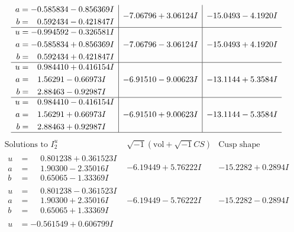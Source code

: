\documentclass[1p]{elsarticle_modified}
\theoremstyle{definition}
\newcommand{\I}{\sqrt{-1}}
\begin{document}
$$\begin{array}{c|c|c}
\begin{aligned}
a &= -0.585834 - 0.856369 I \\
b &= \phantom{-}0.592434 - 0.421847 I\end{aligned}
 & -7.06796 + 3.06124 I & -15.0493 - 4.1920 I \\ \hline\begin{aligned}
u &= -0.994592 - 0.326581 I \\
a &= -0.585834 + 0.856369 I \\
b &= \phantom{-}0.592434 + 0.421847 I\end{aligned}
 & -7.06796 - 3.06124 I & -15.0493 + 4.1920 I \\ \hline\begin{aligned}
u &= \phantom{-}0.984410 + 0.416154 I \\
a &= \phantom{-}1.56291 - 0.66973 I \\
b &= \phantom{-}2.88463 - 0.92987 I\end{aligned}
 & -6.91510 - 9.00623 I & -13.1144 + 5.3584 I \\ \hline\begin{aligned}
u &= \phantom{-}0.984410 - 0.416154 I \\
a &= \phantom{-}1.56291 + 0.66973 I \\
b &= \phantom{-}2.88463 + 0.92987 I\end{aligned}
 & -6.91510 + 9.00623 I & -13.1144 - 5.3584 I\\
 \hline 
 \end{array}$$\newpage$$\begin{array}{c|c|c}  
\text{Solutions to }I^u_{2}& \I (\text{vol} + \sqrt{-1}CS) & \text{Cusp shape}\\
 \hline 
\begin{aligned}
u &= \phantom{-}0.801238 + 0.361523 I \\
a &= \phantom{-}1.90300 - 2.35016 I \\
b &= \phantom{-}0.65065 - 1.33369 I\end{aligned}
 & -6.19449 + 5.76222 I & -15.2282 + 0.2894 I \\ \hline\begin{aligned}
u &= \phantom{-}0.801238 - 0.361523 I \\
a &= \phantom{-}1.90300 + 2.35016 I \\
b &= \phantom{-}0.65065 + 1.33369 I\end{aligned}
 & -6.19449 - 5.76222 I & -15.2282 - 0.2894 I \\ \hline\begin{aligned}
u &= -0.561549 + 0.606799 I \\

\end{aligned}
\end{array}$$
\end{document}
